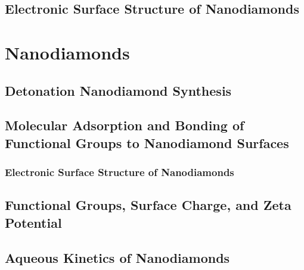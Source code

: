 \subsection{Electronic Surface Structure of Nanodiamonds}







\section{Nanodiamonds}

\subsection{Detonation Nanodiamond Synthesis}



\subsection{Molecular Adsorption and Bonding of Functional Groups to Nanodiamond Surfaces}

\subsubsection{Electronic Surface Structure of Nanodiamonds}



\subsection{Functional Groups, Surface Charge, and Zeta Potential}



\subsection{Aqueous Kinetics of Nanodiamonds}



